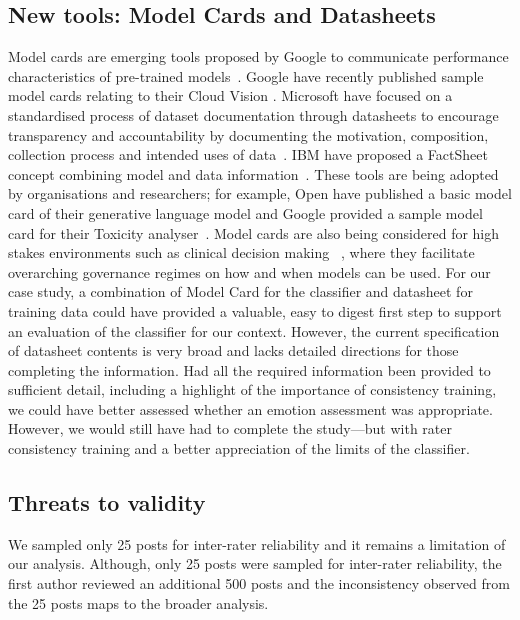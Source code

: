 \subsection{New tools: Model Cards and Datasheets}\label{caise2021:subsec:ModelCards}
Model cards are emerging tools proposed by Google to communicate performance characteristics of pre-trained models~\citep{Mitchell:2018in}.  Google have recently published sample model cards relating to their Cloud Vision .  Microsoft have focused on a standardised process of dataset documentation through datasheets to encourage transparency and accountability by documenting the motivation, composition, collection process and intended uses of data~\citep{Gebru:2018wh}.  IBM have proposed a FactSheet concept combining model and data information~\citep{Arnold2019FactSheets:Conformity}.  These tools are being adopted by organisations and researchers;  for example, Open  have published a basic model card of their generative language model and Google provided a sample model card for their Toxicity analyser~\citep{Mitchell:2018in}.  Model cards are also being considered for high stakes environments such as clinical decision making~ \citep{Sendak2020PresentingLabels}, where they facilitate overarching governance regimes on how and when models can be used.
For our case study, a combination of Model Card for the classifier and datasheet for training data could have provided a valuable, easy to digest first step to support an evaluation of the classifier for our context.  However, the current specification of datasheet contents is very broad and lacks detailed directions for those completing the information.  Had all the required information been provided to sufficient detail, including a highlight of the importance of consistency training, we could have better assessed whether an emotion assessment was appropriate.  However, we would still have had to complete the study---but with rater consistency training and a better appreciation of the limits of the classifier. 

\subsection{Threats to validity} 
 We sampled only 25 posts for inter-rater reliability and it remains a limitation of our analysis.  Although, only 25 posts were sampled for inter-rater reliability, the first author reviewed an additional 500 posts and the inconsistency observed from the 25 posts maps to the broader analysis.

